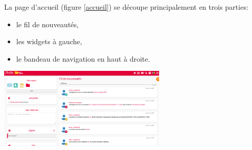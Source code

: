 \documentclass[svgnames,11pt]{beamer}
\begin{document}
\begin{frame}
    \frametitle{}

    La page d'accueil (figure \ref{accueil}) se découpe principalement en trois parties:
\begin{itemize}
\item le fil de nouveautés,
\item les widgets à gauche,
\item le bandeau de navigation en haut à droite.
\end{itemize}
\begin{center}
\centering
\includegraphics[width=8cm]{ressources/timeline.png}
\label{accueil}
\end{center}

\end{frame}
\end{document}
